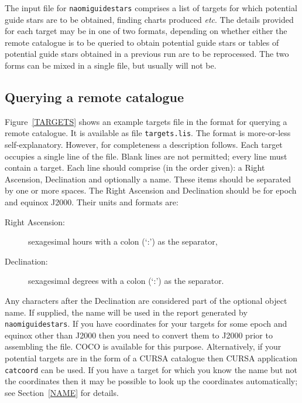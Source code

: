 \documentclass[twoside,11pt]{article}
\newcommand{\xref}[3]{#1}
\renewcommand{\_}{\texttt{\symbol{95}}}
\begin{document}
The input file for {\tt naomiguidestars} comprises a list of targets
for which potential guide stars are to be obtained, finding charts produced
\emph{etc}.  The details provided for each target may be in one of
two formats, depending on whether either the remote catalogue is to be
queried to obtain potential guide stars or tables of potential guide
stars obtained in a previous run are to be reprocessed.  The two forms
can be mixed in a single file, but usually will not be.

\subsection{Querying a remote catalogue}

Figure~\ref{TARGETS} shows an example targets file in the format for
querying a remote catalogue.  It is available as file {\tt targets.lis}.
The format is more-or-less self-explanatory.  However, for completeness a
description follows.  Each target occupies a single line of the file.
Blank lines are not permitted; every line must contain a target.  Each
line should    comprise (in the order given): a Right Ascension, Declination
and optionally a name.  These items should be separated by one or more
spaces.  The Right Ascension and Declination should be for epoch and
equinox J2000.  Their units and formats are:

\begin{description}

  \item[{\rm Right Ascension:}] sexagesimal hours with a colon (`:')
   as the separator,

  \item[{\rm Declination:}] sexagesimal degrees with a colon (`:')
   as the separator.

\end{description}

Any characters after the Declination are considered part of the optional
object name.  If supplied, the name will be used in the report generated by
{\tt naomiguidestars}.  If you have coordinates for your targets for some
epoch and equinox other than J2000 then you need to convert them to J2000
prior to assembling the file.  \xref{COCO}{sun56}{}\cite{SUN56} is available
for this purpose.  Alternatively, if your potential targets are in the form
of a \xref{CURSA}{sun190}{}\cite{SUN190} catalogue then CURSA application
{\tt catcoord} can be used.  If you have a target for which you know the
name but not the coordinates then it may be possible to look up the
coordinates automatically; see Section~\ref{NAME} for details.
\end{document}
